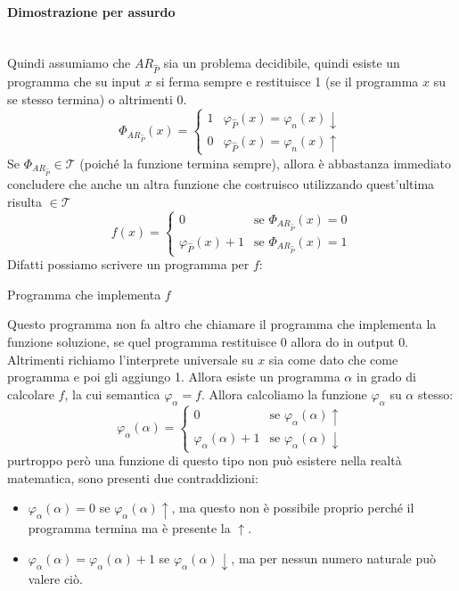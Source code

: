 \documentclass{article}
\begin{document}
\paragraph{Dimostrazione per assurdo}\mbox{}\\
Quindi assumiamo che $AR_{\hat{P}}$ sia un problema decidibile, quindi esiste un programma
che su input $x$ si ferma sempre e restituisce 1 (se il programma $x$ su se stesso termina) o altrimenti 0.
\[
    \Phi_{AR_{\hat{P}}}(x)=
    \begin{cases}
        1 & \varphi_{\hat{P}}(x)=\varphi_n(x)\downarrow \\
        0 & \varphi_{\hat{P}}(x)=\varphi_n(x)\uparrow
    \end{cases}
\]
Se $\Phi_{AR_{\hat{P}}}\in\mathcal{T}$ (poiché la funzione termina sempre), allora è abbastanza
immediato concludere che anche un altra funzione che costruisco utilizzando quest'ultima
risulta $\in\mathcal{T}$
\[
    f(x)=
    \begin{cases}
        0                      & \text{se }\Phi_{AR_{\hat{P}}}(x)=0  \\
        \varphi_{\hat{P}}(x)+1 & \text{se } \Phi_{AR_{\hat{P}}}(x)=1
    \end{cases}
\]
Difatti possiamo scrivere un programma per $f$:
\begin{algorithm}[hbt!]
    \caption{Programma che implementa $f$}\label{alg:prog_f}
\end{algorithm}
Questo programma non fa altro che chiamare il programma che implementa
la funzione soluzione, se quel programma restituisce 0 allora do in output 0.
Altrimenti richiamo l'interprete universale su $x$ sia come dato che come programma
e poi gli aggiungo 1.
\newline\newline
Allora esiste un programma $\alpha$ in grado di calcolare $f$, la cui semantica
$\varphi_\alpha=f$. Allora calcoliamo la funzione $\varphi_\alpha$ su $\alpha$
stesso:
\[
    \varphi_\alpha(\alpha)=
    \begin{cases}
        0                        & \text{se }\varphi_\alpha(\alpha)\uparrow   \\
        \varphi_\alpha(\alpha)+1 & \text{se }\varphi_\alpha(\alpha)\downarrow
    \end{cases}
\]
purtroppo però una funzione di questo tipo non può esistere nella realtà matematica,
sono presenti due contraddizioni:
\begin{itemize}
    \item $\varphi_\alpha(\alpha)=0$ se $\varphi_\alpha(\alpha)\uparrow$, ma questo non è possibile
proprio perché il programma termina ma è presente la $\uparrow$.
\item $\varphi_\alpha(\alpha)=\varphi_\alpha(\alpha)+1$ se $\varphi_\alpha(\alpha)\downarrow$, ma per
nessun numero naturale può valere ciò.
\end{itemize}
\end{document}

